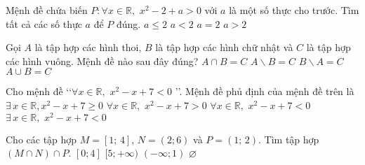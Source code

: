 \begin{ex}%
Mệnh đề chứa biến  $P:\forall x \in \mathbb{R},\,\,{x^2} - 2 + a > 0$ với $ a $ là một số thực cho trước. Tìm tất cả các số thực $ a $  để  $ P $ đúng.
\choice
{ $a \le 2$ }
{$a < 2$  }
{ $a = 2$ }
{\True $a > 2$ }
\end{ex}

\begin{ex} %
Gọi ${A}$ là tập hợp các hình thoi, ${B}$ là tập hợp các hình chữ nhật và ${C}$ là tập hợp các hình vuông. Mệnh đề nào sau đây đúng?
\choice
{ \True $A\cap B=C $}
{ $A\backslash B=C$}
{ $B\backslash A=C$}
{ ${A\cup B=C}$
}
\end{ex}

\begin{ex}%
Cho mệnh đề \lq\lq $\forall x \in \mathbb{R} ,\,\,{x^2} - x + 7 < 0$ \rq\rq. Mệnh đề phủ định của mệnh đề trên là
\choice
{\True $\exists \,x \in \mathbb{R}, {x^2} - x + 7 \ge 0$ }
{ $\forall x \in \mathbb{R},\,\,{x^2} - x + 7 > 0$ }
{ $\forall x \in \mathbb{R},\,\,{x^2} - x + 7 < 0$ }
{ $\exists \,x \in \mathbb{R} ,\,\,{x^2} - x + 7 < 0$ }
\end{ex}

\begin{ex} %
Cho các tập hợp $M=[ 1;\,4 ]$, $N = (2; 6)$ và $P=( 1;\,2 )$. Tìm tập hợp $(M \cap N) \cap P$.
\choice
{ $[0; 4]$}
{ $[5; + \infty )$}
{ $(- \infty; 1)$}
{ \True $\varnothing $}
\loigiai{
Ta có $M\cap N=(2;4]\Rightarrow M\cap N\cap P=(2;4]\cap (1;2)=\varnothing.$}
\end{ex}


